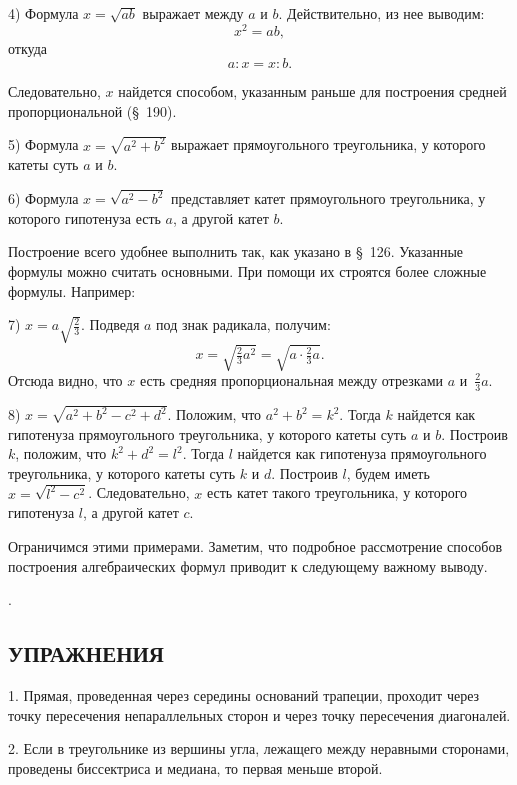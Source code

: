 \documentclass[oneside]{book}
\begin{document}
4) Формула $x=\sqrt{ab}$ выражает  между $a$ и $b$.
Действительно, из нее выводим:
\[x^2=ab,\]
откуда
\[a:x=x:b.\]

Следовательно, $x$ найдется способом, указанным раньше для построения средней пропорциональной (§~190).

5) Формула $x=\sqrt{a^2+b^2}$ выражает  прямоугольного треугольника, у которого катеты суть $a$ и $b$. %


6) Формула $x=\sqrt{a^2-b^2}$ представляет катет прямоугольного треугольника, у которого гипотенуза есть $a$, а другой катет $b$.

Построение всего удобнее выполнить так, как указано в §~126.
Указанные формулы можно считать основными.
При помощи их строятся более сложные формулы.
Например:

7) $x=a\sqrt{\frac23}$.
Подведя $a$ под знак радикала, получим:
\[x=\sqrt{\tfrac23a^2}=\sqrt{a\cdot\tfrac23a}.\]
Отсюда видно, что $x$ есть средняя пропорциональная между отрезками $a$ и~$\tfrac23a$.

8) $x=\sqrt{a^2 + b^2 - c^2 + d^2}$.
Положим, что  $a^2+b^2=k^2$.
Тогда $k$ найдется как гипотенуза прямоугольного треугольника, у которого катеты суть $a$ и $b$.
Построив $k$, положим, что $k^2+d^2=l^2$.
Тогда $l$ найдется как гипотенуза прямоугольного треугольника, у которого катеты суть $k$ и $d$.
Построив $l$, будем иметь $x=\sqrt{l^2-c^2}$.
Следовательно, $x$ есть катет такого треугольника, у которого гипотенуза $l$, а другой катет $c$.

Ограничимся этими примерами.
Заметим, что подробное рассмотрение способов построения алгебраических формул приводит к следующему важному выводу.

.

\subsection*{УПРАЖНЕНИЯ}


1.
Прямая, проведенная через середины оснований трапеции, проходит через точку пересечения непараллельных сторон и через точку пересечения диагоналей.

2.
Если в треугольнике из вершины угла, лежащего между неравными сторонами, проведены биссектриса и медиана, то первая меньше второй.
\end{document}
